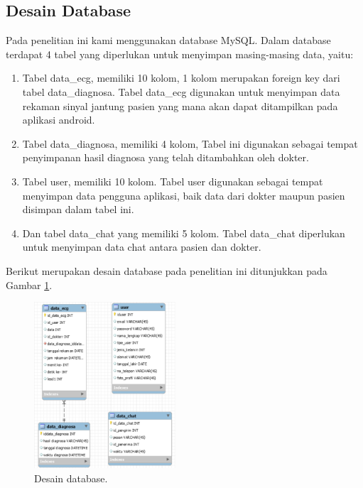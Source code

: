 \documentclass[conference]{IEEEtran}
\begin{document}
	\vspace{1ex}
	
	\subsection{Desain Database}
	\vspace{1ex}
	
	Pada penelitian ini kami menggunakan database MySQL. Dalam database terdapat 4 tabel yang diperlukan untuk menyimpan masing-masing data, yaitu:
	\begin{enumerate}
		\vspace{1mm}
		\item Tabel data\_ecg, memiliki 10 kolom, 1 kolom merupakan foreign key dari tabel data\_diagnosa. Tabel data\_ecg digunakan untuk menyimpan data rekaman sinyal jantung pasien yang mana akan dapat ditampilkan pada aplikasi android.
		\vspace{1mm}
		\item Tabel data\_diagnosa, memiliki 4 kolom, Tabel ini digunakan sebagai tempat penyimpanan hasil diagnosa yang telah ditambahkan oleh dokter.
		\vspace{1mm}
		\item Tabel user, memiliki 10 kolom. Tabel user digunakan sebagai tempat menyimpan data pengguna aplikasi, baik data dari dokter maupun pasien disimpan dalam tabel ini.
		\vspace{1mm}
		\item Dan tabel data\_chat yang memiliki 5 kolom. Tabel data\_chat diperlukan untuk menyimpan data chat antara pasien dan dokter.
	\end{enumerate}
	
	Berikut merupakan desain database pada penelitian ini ditunjukkan pada Gambar \ref{fig:3.4}. 
	\begin{figure}[!ht] \centering
		\includegraphics[width=0.47\textwidth]{img/db.png}
		\caption{Desain database.}
		\label{fig:3.4}
	\end{figure}
	\vspace{1ex}
	
\end{document}

